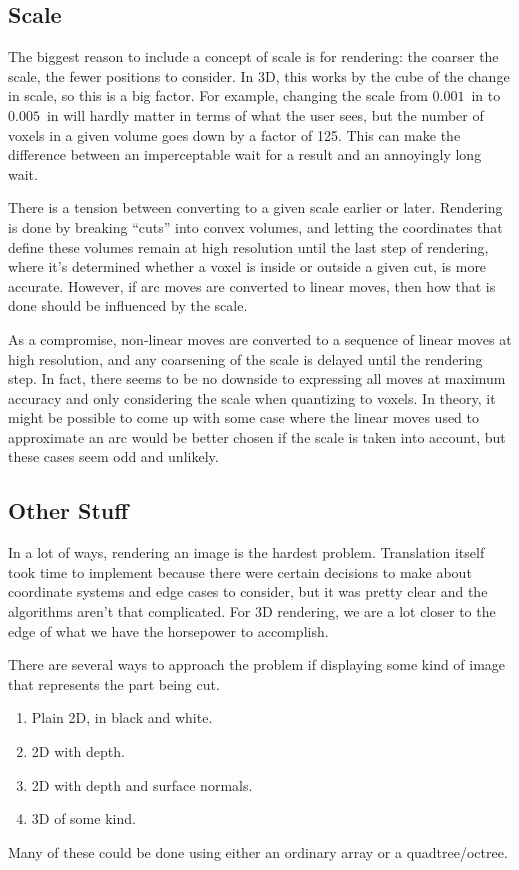 \documentclass[titlepage,oneside,10pt]{article}
\begin{document}
\subsection{Scale}

The biggest reason to include a concept of scale is for rendering: the
coarser the scale, the fewer positions to consider. In 3D, this works
by the cube of the change in scale, so this is a big factor. For
example, changing the scale from $0.001$~in to $0.005$~in will hardly
matter in terms of what the user sees, but the number of voxels in a
given volume goes down by a factor of 125. This can make the
difference between an imperceptable wait for a result and an
annoyingly long wait.

There is a tension between converting to a given scale earlier or
later. Rendering is done by breaking ``cuts'' into convex volumes, and
letting the coordinates that define these volumes remain at high
resolution until the last step of rendering, where it's determined
whether a voxel is inside or outside a given cut, is more
accurate. However, if arc moves are converted to linear moves, then
how that is done should be influenced by the scale.

As a compromise, non-linear moves are converted to a sequence of
linear moves at high resolution, and any coarsening of the scale is
delayed until the rendering step. In fact, there seems to be no
downside to expressing all moves at maximum accuracy and only
considering the scale when quantizing to voxels. In theory, it might
be possible to come up with some case where the linear moves used to
approximate an arc would be better chosen if the scale is taken into
account, but these cases seem odd and unlikely.


\subsection{Other Stuff}

In a lot of ways, rendering an image is the hardest
problem. Translation itself took time to implement because there were
certain decisions to make about coordinate systems and edge cases to
consider, but it was pretty clear and the algorithms aren't that
complicated. For 3D rendering, we are a lot closer to the edge of what
we have the horsepower to accomplish.

There are several ways to approach the problem if displaying some kind
of image that represents the part being cut.
\begin{enumerate}
\item Plain 2D, in black and white.
\item 2D with depth.
\item 2D with depth and surface normals.
\item 3D of some kind.
\end{enumerate}
Many of these could be done using either an ordinary array or a
quadtree/octree.
\end{document}
